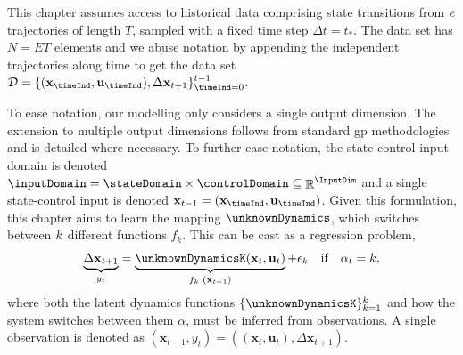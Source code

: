 \documentclass{mimosis-class/mimosis}
\numberwithin{equation}{chapter}
\DeclareMathOperator{\R}{\mathbb{R}}
\newcommand{\numData}{\ensuremath{t}}
\newcommand{\numEpisodes}{\ensuremath{e}}
\newcommand{\modeInd}{\ensuremath{k}}
\newcommand{\NumData}{\ensuremath{\MakeUppercase{\numData}}}
\newcommand{\ModeInd}{\ensuremath{\MakeUppercase{\modeInd}}}
\newcommand{\NumEpisodes}{\MakeUppercase{\numEpisodes}}
\newcommand{\singleData}[1]{\ensuremath{#1_{\numData}}}
\newcommand{\mode}[1]{\ensuremath{#1_{\modeInd}}}
\newcommand{\state}{\ensuremath{\mathbf{x}}}
\newcommand{\control}{\ensuremath{\mathbf{u}}}
\newcommand{\x}{\ensuremath{\mathbf{x}}}
\newcommand{\y}{\ensuremath{y}}
\newcommand{\singleInput}{\ensuremath{\x_{\numData-1}}}
\newcommand{\singleOutput}{\ensuremath{\singleData{\y}}}
\newcommand{\modeVar}{\ensuremath{\alpha}}
\newcommand{\modeVarn}{\ensuremath{\singleData{\modeVar}}}
\newcommand{\modeVarK}{\ensuremath{\modeVarn=\modeInd}}
\newcommand{\latentFunc}{\ensuremath{f}}
\begin{document}
This chapter assumes access to historical data comprising state transitions from \(\NumEpisodes\) trajectories
of length \(T\), sampled  with a  fixed  time step \(\Delta t=t_{*}\).
The data set has \({N=ET}\) elements
and we abuse notation by appending the independent trajectories along
time to get the data set
\(\mathcal{D}=\{(\state_{\timeInd},\control_{\timeInd}),\Delta \state_{t+1}\}^{\NumData-1}_{\timeInd=0}\).

To ease notation, our modelling only considers a single output dimension.
The extension to multiple output dimensions follows from standard \acrshort{gp} methodologies and is detailed where necessary.
To further ease notation, the state-control input domain is denoted
\(\inputDomain = \stateDomain \times \controlDomain \subseteq \R^{\InputDim}\)
and a single state-control input is denoted
\(\singleInput = (\state_{\timeInd},\control_{\timeInd})\).
Given this formulation, this chapter aims to learn the mapping \(\unknownDynamics\),
which switches between \(\ModeInd\) different functions \(\mode{\latentFunc}\).
This can be cast as a regression problem,
\begin{align} \label{eq-multimodal-dynamics-disc-regression}
\underbrace{\Delta \state_{t+1}}_{\text{\singleOutput}}
= \underbrace{\unknownDynamicsK(\state_{t}, \control_{t})}_{\text{\mode{\latentFunc} (\singleInput)}}
+ \mode{\epsilon}
\quad \text{if} \quad \modeVarK,
\end{align}
where both the latent dynamics functions \(\{\unknownDynamicsK\}_{\modeInd=1}^{\ModeInd}\)
and how the system switches between them
\(\modeVar\), must be inferred from observations.
A single observation is denoted as \((\singleInput, \singleOutput) = ((\state_{t},\control_{t}), \Delta \state_{t+1})\).
\end{document}
